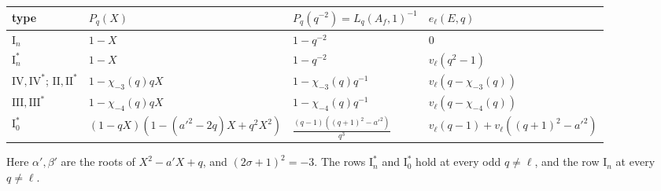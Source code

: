 \begin{lemma}
\begin{center}
\medskip
\begin{tabular}{llll}
\toprule
type & $P_q(X)$ & $P_q(q^{-2})=L_q(A_f,1)^{-1}$ & $e_\ell(E,q)$\\
\midrule
$\mathrm I_n$ & $1-X$ & $1-q^{-2}$ & $0$\\
$\mathrm I_n^*$ & $1-X$ & $1-q^{-2}$ & $v_\ell(q^2-1)$\\
$\mathrm{IV},\mathrm{IV}^*$; $\mathrm{II},\mathrm{II}^*$ & $1-\chi_{-3}(q)qX$ & $1-\chi_{-3}(q)q^{-1}$ & $v_\ell(q-\chi_{-3}(q))$\\
$\mathrm{III},\mathrm{III}^*$ & $1-\chi_{-4}(q)qX$ & $1-\chi_{-4}(q)q^{-1}$ & $v_\ell(q-\chi_{-4}(q))$\\
$\mathrm I_0^*$ & $(1-qX)(1-(a'^2-2q)X+q^2X^2)$ & $\frac{(q-1)((q+1)^2-a'^2)}{q^3}$ & $v_\ell(q-1)+v_\ell((q+1)^2-a'^2)$\\
\bottomrule
\end{tabular}
\end{center}
Here $\alpha',\beta'$ are the roots of $X^2-a'X+q$, and $(2\sigma+1)^2=-3$. The rows $\mathrm I_n^*$ and $\mathrm I_0^*$ hold at every odd $q\ne\ell$, and the row $\mathrm I_n$ at every $q\ne\ell$.
\end{lemma}

